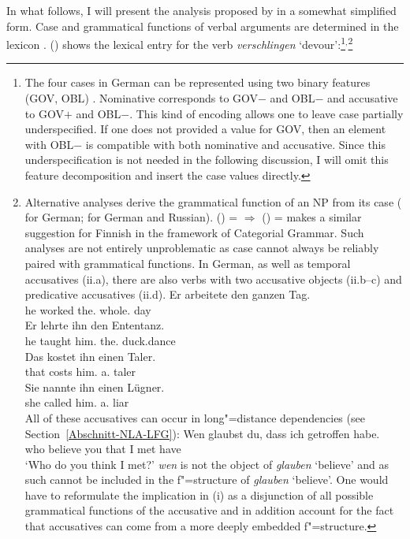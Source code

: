 In what follows, I will present the analysis proposed by  \citet[Section~2.1.3]{Berman96a-u} in a
somewhat simplified form. Case and grammatical functions of verbal arguments are determined
in the lexicon \citep[]{Berman96a-u}. () shows the lexical entry for the verb \emph{verschlingen} `devour':\footnote{%
The four cases in German can be represented using two binary features ({\small GOV}, {\small OBL}) \citep[]{Berman96a-u}. Nominative corresponds to {\small GOV}$-$ and
  {\small OBL}$-$ and accusative to {\small GOV}$+$ and {\small OBL}$-$. This kind of encoding allows one to leave case partially underspecified. If one does not provided a value
  for {\small GOV}, then an element with {\small OBL}$-$  is compatible with both nominative and accusative. Since this underspecification is not needed in the following discussion,
  I will omit this feature decomposition and insert the case values directly.
}$^,$\footnote{%
	Alternative analyses derive the grammatical function of an NP from its case ( for German;  for German and Russian).
\ea
\label{Kasus-Implikation-Berman}
\upshape      (\downsp \case) = \mdacc{} $\Rightarrow$ (\upsp \obj) = \down{}
\z
  \citet[Section~2.1]{Karttunen89a-u} makes a similar suggestion for Finnish in the framework of Categorial Grammar\indexcxg.
  Such analyses are not entirely unproblematic as case cannot always be reliably paired with grammatical functions. In German, as well as temporal
  accusatives (ii.a), there are also verbs with two accusative objects (ii.b--c) and predicative accusatives (ii.d).
\eal
\ex 
\gll Er arbeitete den ganzen Tag.\\
	 he worked the.\acc{} whole.\acc{} day\\
\ex 
\gll Er lehrte ihn den Ententanz.\\
	 he taught him.\acc{} the.\acc{} duck.dance\\
\ex 
\gll Das kostet ihn einen Taler.\\
	 that costs him.\acc{} a.\acc{} taler\\
\ex 
\gll Sie nannte ihn einen Lügner.\\
	 she called him.\acc{} a.\acc{} liar\\
\zl
All of these accusatives can occur in long"=distance dependencies (see Section~\ref{Abschnitt-NLA-LFG}):
\ea
\gll Wen glaubst du, dass ich getroffen habe.\\
	 who believe you that I met have\\
\glt `Who do you think I met?'
\z
\emph{wen} is not the object of \emph{glauben} `believe' and as such cannot be included in the
f"=structure of \emph{glauben} `believe'. One would have to reformulate the implication in
(i) as a disjunction of all possible grammatical functions of the accusative and in addition account for the fact that accusatives can come from a more deeply embedded f"=structure.
}
